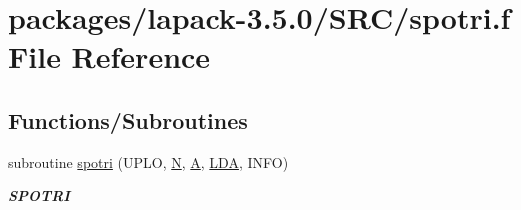 \hypertarget{spotri_8f}{}\section{packages/lapack-\/3.5.0/\+S\+R\+C/spotri.f File Reference}
\label{spotri_8f}
\subsection*{Functions/\+Subroutines}
\begin{DoxyCompactItemize}
\item 
subroutine \hyperlink{group__realPOcomputational_ga4c381894bb34b1583fcc0dceafc5bea1}{spotri} (U\+P\+L\+O, \hyperlink{polmisc_8c_a0240ac851181b84ac374872dc5434ee4}{N}, \hyperlink{classA}{A}, \hyperlink{example__user_8c_ae946da542ce0db94dced19b2ecefd1aa}{L\+D\+A}, I\+N\+F\+O)
\begin{DoxyCompactList}\small\item\em {\bfseries S\+P\+O\+T\+R\+I} \end{DoxyCompactList}\end{DoxyCompactItemize}
